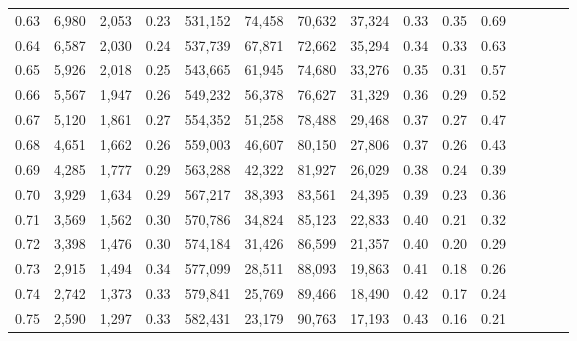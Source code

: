 \begin{tabular}{rrrcrrrrrrrrrrr}
0.63 &   6,980 &  2,053 &                                       0.23 &  531,152 &   74,458 &   70,632 &   37,324 &  0.33 &  0.35 &                         0.69 \\
0.64 &   6,587 &  2,030 &                                       0.24 &  537,739 &   67,871 &   72,662 &   35,294 &  0.34 &  0.33 &                         0.63 \\
0.65 &   5,926 &  2,018 &                                       0.25 &  543,665 &   61,945 &   74,680 &   33,276 &  0.35 &  0.31 &                         0.57 \\
0.66 &   5,567 &  1,947 &                                       0.26 &  549,232 &   56,378 &   76,627 &   31,329 &  0.36 &  0.29 &                         0.52 \\
0.67 &   5,120 &  1,861 &                                       0.27 &  554,352 &   51,258 &   78,488 &   29,468 &  0.37 &  0.27 &                         0.47 \\
0.68 &   4,651 &  1,662 &                                       0.26 &  559,003 &   46,607 &   80,150 &   27,806 &  0.37 &  0.26 &                         0.43 \\
0.69 &   4,285 &  1,777 &                                       0.29 &  563,288 &   42,322 &   81,927 &   26,029 &  0.38 &  0.24 &                         0.39 \\
0.70 &   3,929 &  1,634 &                                       0.29 &  567,217 &   38,393 &   83,561 &   24,395 &  0.39 &  0.23 &                         0.36 \\
0.71 &   3,569 &  1,562 &                                       0.30 &  570,786 &   34,824 &   85,123 &   22,833 &  0.40 &  0.21 &                         0.32 \\
0.72 &   3,398 &  1,476 &                                       0.30 &  574,184 &   31,426 &   86,599 &   21,357 &  0.40 &  0.20 &                         0.29 \\
0.73 &   2,915 &  1,494 &                                       0.34 &  577,099 &   28,511 &   88,093 &   19,863 &  0.41 &  0.18 &                         0.26 \\
0.74 &   2,742 &  1,373 &                                       0.33 &  579,841 &   25,769 &   89,466 &   18,490 &  0.42 &  0.17 &                         0.24 \\
0.75 &   2,590 &  1,297 &                                       0.33 &  582,431 &   23,179 &   90,763 &   17,193 &  0.43 &  0.16 &                         0.21 \\

\end{tabular}
